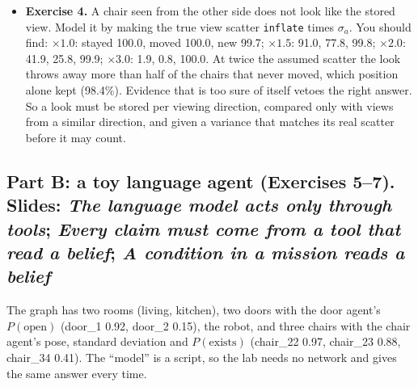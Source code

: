 \documentclass[11pt]{article}
\begin{document}
\begin{itemize}
\item \textbf{Exercise 4.} A chair seen from the other side does not look like the stored view. Model it by making the true view scatter \texttt{inflate} times $\sigma_a$. You should find: $\times1.0$: stayed 100.0, moved 100.0, new 99.7; $\times1.5$: 91.0, 77.8, 99.8; $\times2.0$: 41.9, 25.8, 99.9; $\times3.0$: 1.9, 0.8, 100.0. At twice the assumed scatter the look throws away more than half of the chairs that never moved, which position alone kept (98.4\%). Evidence that is too sure of itself vetoes the right answer. So a look must be stored per viewing direction, compared only with views from a similar direction, and given a variance that matches its real scatter before it may count.
\end{itemize}

\subsection*{Part B: a toy language agent (Exercises 5--7). Slides: \emph{The language model acts only through tools}; \emph{Every claim must come from a tool that read a belief}; \emph{A condition in a mission reads a belief}}
The graph has two rooms (living, kitchen), two doors with the door agent's $P(\text{open})$ (door\_1 0.92, door\_2 0.15), the robot, and three chairs with the chair agent's pose, standard deviation and $P(\text{exists})$ (chair\_22 0.97, chair\_23 0.88, chair\_34 0.41). The ``model'' is a script, so the lab needs no network and gives the same answer every time.
\end{document}

